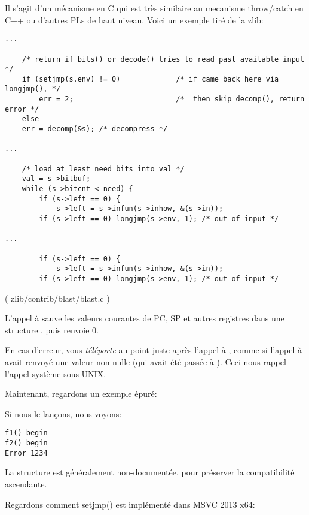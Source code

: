 

Il s'agit d'un mécanisme en C qui est très similaire au mecanisme throw/catch en
C++ ou d'autres \ac{PL}s de haut niveau.
Voici un exemple tiré de la zlib:

\begin{lstlisting}[style=customc]
...

    /* return if bits() or decode() tries to read past available input */
    if (setjmp(s.env) != 0)             /* if came back here via longjmp(), */
        err = 2;                        /*  then skip decomp(), return error */
    else
	err = decomp(&s); /* decompress */

...

    /* load at least need bits into val */
    val = s->bitbuf;
    while (s->bitcnt < need) {
        if (s->left == 0) {
            s->left = s->infun(s->inhow, &(s->in));
	    if (s->left == 0) longjmp(s->env, 1); /* out of input */

...

        if (s->left == 0) {
            s->left = s->infun(s->inhow, &(s->in));
	    if (s->left == 0) longjmp(s->env, 1); /* out of input */
\end{lstlisting}
( zlib/contrib/blast/blast.c )

L'appel à  sauve les valeurs courantes de \ac{PC}, \ac{SP} et autres
registres dans une structure , puis renvoie 0.

En cas d'erreur,  vous \emph{téléporte} au point juste après l'appel
à , comme si l'appel à  avait renvoyé une valeur non nulle
(qui avait été passée à ).
Ceci nous rappel l'appel système  sous UNIX.

Maintenant, regardons un exemple épuré:



Si nous le lançons, nous voyons:

\begin{lstlisting}
f1() begin
f2() begin
Error 1234
\end{lstlisting}

La structure  est généralement non-documentée, pour préserver la compatibilité
ascendante.

Regardons comment setjmp() est implémenté dans MSVC 2013 x64:

